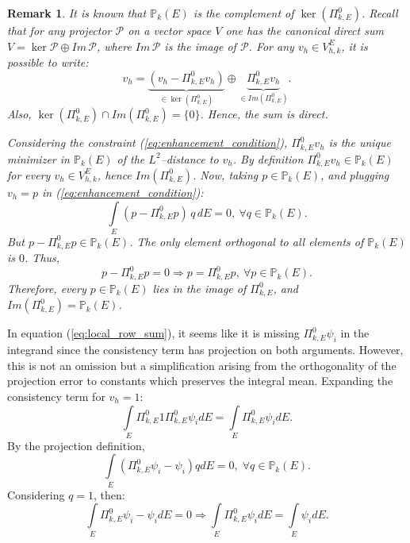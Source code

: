\documentclass{article}
\newtheorem{rem}{Remark}[section]
\renewcommand{\P}[1]{\mathbb{P}_k(#1)}
\newcommand{\scalmassproj}{\Pi^{0}_{k,E}}
\newcommand{\localvespace}{V^E_{h,k}}
\newcommand{\integral}[1]{\int \limits_{#1}}
\begin{document}
\begin{rem}
    It is known that $\mathbb{P}_k(E)$ is the complement of $\ker (\Pi^{0}_{k,E})$. Recall that for any projector $\mathcal{P}$ on a vector space $V$ one has the canonical direct sum $V = \ker \mathcal{P} \oplus Im \, \mathcal{P}$, where $Im \, \mathcal{P}$ is the image of $\mathcal{P}$. For any $v_h \in V^E_{h,k}$, it is possible to write:
    \begin{equation}
    \nonumber
        v_h = \underbrace{(v_h - \Pi^{0}_{k,E} v_h)}_{\in \ker (\Pi^{0}_{k,E})} \oplus \underbrace{\Pi^{0}_{k,E} v_h}_{\in Im (\Pi^{0}_{k,E})}. 
    \end{equation}
    Also, $\ker (\Pi^{0}_{k,E}) \cap Im(\Pi^{0}_{k,E}) = \{ 0 \}$. Hence, the sum is direct.

    Considering the constraint (\ref{eq:enhancement_condition}), $\Pi^{0}_{k,E}v_h$ is the unique minimizer in $\mathbb{P}_k(E)$ of the $L^2$--distance to $v_h$. By definition $\scalmassproj v_h \in \P{E}$ for every $v_h \in \localvespace$, hence $Im (\scalmassproj)$. Now, taking $p \in \P{E}$, and plugging $v_h = p$ in (\ref{eq:enhancement_condition}):
    \begin{equation}
    \nonumber
        \int \limits_E (p - \scalmassproj p)\,q \, dE = 0, \: \forall q \in \P{E}.
    \end{equation}
    But $p - \scalmassproj p \in \P{E}$. The only element orthogonal to all elements of $\P{E}$ is $0$. Thus, 
    \begin{equation}
    \nonumber
        p - \scalmassproj p  = 0 \Rightarrow p = \scalmassproj p, \: \forall p \in \P{E}. 
    \end{equation}
    Therefore, every $p \in \P{E}$ lies in the image of $\scalmassproj$, and $Im (\scalmassproj) = \P{E}$. 
\end{rem}

In equation (\ref{eq:local_row_sum}), it seems like it is missing $\scalmassproj \psi_i$ in the integrand since the consistency term has projection on both arguments. However, this is not an omission but a simplification arising from the orthogonality of the projection error to constants which preserves the integral mean. Expanding the consistency term for $v_h = 1$:
\begin{equation}
    \nonumber
    \int \limits_E \scalmassproj 1 \scalmassproj \psi_i dE = \int \limits_E  \scalmassproj \psi_i dE. 
\end{equation}
By the projection definition, 
\begin{equation}
    \nonumber
    \int \limits_E (\scalmassproj \psi_i - \psi_i)q dE = 0, \; \forall q \in \P{E}.
\end{equation}
Considering $q = 1$, then:
\begin{equation}
    \nonumber
    \int \limits_E \scalmassproj \psi_i - \psi_i dE = 0 \Rightarrow \integral{E} \scalmassproj \psi_i dE = \integral{E} \psi_i dE.
\end{equation}
\end{document}
